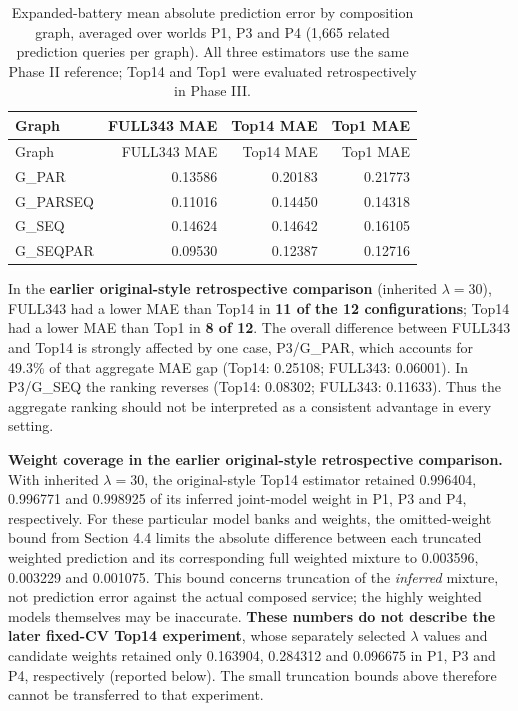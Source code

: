 \documentclass[10pt,a4paper]{article}
\begin{document}
\begingroup\footnotesize\setlength{\tabcolsep}{3pt}
\begin{longtable}{@{}p{}rrr@{}}
\caption{Expanded-battery mean absolute prediction error by composition graph, averaged over worlds P1, P3 and P4 (1,665 related prediction queries per graph). All three estimators use the same Phase II reference; Top14 and Top1 were evaluated retrospectively in Phase III.}\label{tab:retrospective-m3-by-graph}\\
\toprule
Graph & FULL343 MAE & Top14 MAE & Top1 MAE \\
\midrule\endfirsthead
\toprule
Graph & FULL343 MAE & Top14 MAE & Top1 MAE \\
\midrule\endhead
G\_PAR & 0.13586 & 0.20183 & 0.21773 \\
G\_PARSEQ & 0.11016 & 0.14450 & 0.14318 \\
G\_SEQ & 0.14624 & 0.14642 & 0.16105 \\
G\_SEQPAR & 0.09530 & 0.12387 & 0.12716 \\
\bottomrule
\end{longtable}\endgroup

In the \textbf{earlier original-style retrospective comparison} (inherited $\lambda=30$), FULL343 had a lower MAE than Top14 in \textbf{11 of the 12 configurations}; Top14 had a lower MAE than Top1 in \textbf{8 of 12}. The overall difference between FULL343 and Top14 is strongly affected by one case, P3/G\_PAR, which accounts for 49.3\% of that aggregate MAE gap (Top14: 0.25108; FULL343: 0.06001). In P3/G\_SEQ the ranking reverses (Top14: 0.08302; FULL343: 0.11633). Thus the aggregate ranking should not be interpreted as a consistent advantage in every setting.

\textbf{Weight coverage in the earlier original-style retrospective comparison.} With inherited $\lambda=30$, the original-style Top14 estimator retained 0.996404, 0.996771 and 0.998925 of its inferred joint-model weight in P1, P3 and P4, respectively. For these particular model banks and weights, the omitted-weight bound from Section 4.4 limits the absolute difference between each truncated weighted prediction and its corresponding full weighted mixture to 0.003596, 0.003229 and 0.001075. This bound concerns truncation of the \emph{inferred} mixture, not prediction error against the actual composed service; the highly weighted models themselves may be inaccurate. \textbf{These numbers do not describe the later fixed-CV Top14 experiment}, whose separately selected $\lambda$ values and candidate weights retained only 0.163904, 0.284312 and 0.096675 in P1, P3 and P4, respectively (reported below). The small truncation bounds above therefore cannot be transferred to that experiment.
\end{document}
